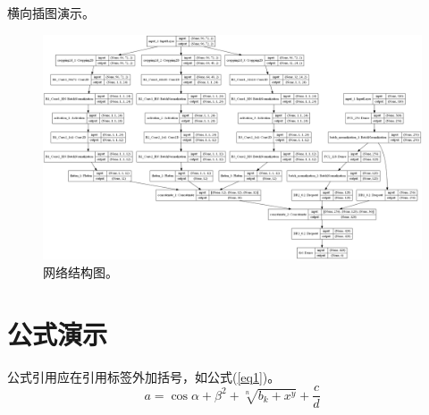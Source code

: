 \documentclass[unicode,pdfcover]{scutthesis}
\begin{document}
横向插图演示。
\begin{landscape}
\begin{figure}[htp]
  \centering
  \includegraphics[width=0.8\columnwidth,keepaspectratio]{figure/FIG2-5}
  \caption{网络结构图。}
  \label{FIG-5}
\end{figure}
\end{landscape}

\section{公式演示}
公式引用应在引用标签外加括号，如公式(\ref{eq1})。
\begin{equation}\label{eq1}
  a=\cos\alpha+\beta^{2}+\sqrt[n]{b_{k}+x^{y}}+\frac{c}{d}
\end{equation}
\end{document}

